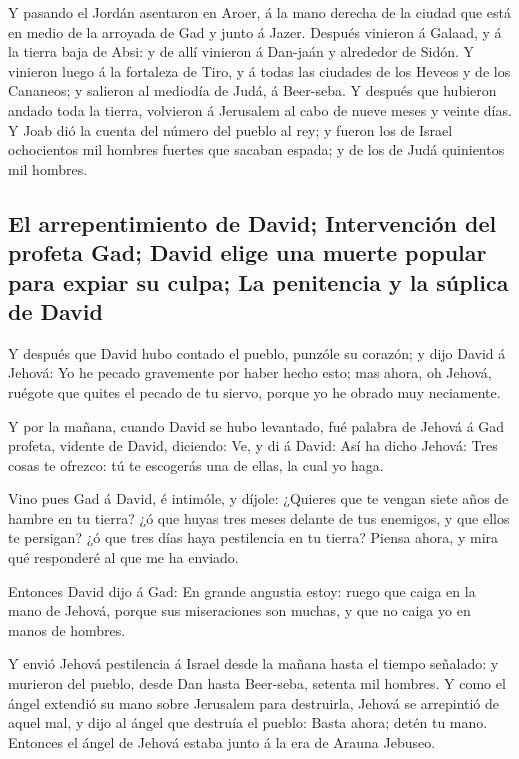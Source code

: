  Y pasando el Jordán asentaron en Aroer, á la mano derecha
de la ciudad que está en medio de la arroyada de Gad y junto á Jazer.
 Después vinieron á Galaad, y á la tierra baja de Absi: y de
allí vinieron á Dan-jaán y alrededor de Sidón.  Y vinieron
luego á la fortaleza de Tiro, y á todas las ciudades de los Heveos y de
los Cananeos; y salieron al mediodía de Judá, á Beer-seba. 
Y después que hubieron andado toda la tierra, volvieron á Jerusalem al
cabo de nueve meses y veinte días.  Y Joab dió la cuenta del
número del pueblo al rey; y fueron los de Israel ochocientos mil hombres
fuertes que sacaban espada; y de los de Judá quinientos mil hombres.

\hypertarget{el-arrepentimiento-de-david-intervenciuxf3n-del-profeta-gad-david-elige-una-muerte-popular-para-expiar-su-culpa-la-penitencia-y-la-suxfaplica-de-david}{%
\subsection{El arrepentimiento de David; Intervención del profeta Gad;
David elige una muerte popular para expiar su culpa; La penitencia y la
súplica de
David}\label{el-arrepentimiento-de-david-intervenciuxf3n-del-profeta-gad-david-elige-una-muerte-popular-para-expiar-su-culpa-la-penitencia-y-la-suxfaplica-de-david}}

 Y después que David hubo contado el pueblo, punzóle su
corazón; y dijo David á Jehová: Yo he pecado gravemente por haber hecho
esto; mas ahora, oh Jehová, ruégote que quites el pecado de tu siervo,
porque yo he obrado muy neciamente.

 Y por la mañana, cuando David se hubo levantado, fué
palabra de Jehová á Gad profeta, vidente de David, diciendo:
 Ve, y di á David: Así ha dicho Jehová: Tres cosas te
ofrezco: tú te escogerás una de ellas, la cual yo haga.

 Vino pues Gad á David, é intimóle, y díjole: ¿Quieres que
te vengan siete años de hambre en tu tierra? ¿ó que huyas tres meses
delante de tus enemigos, y que ellos te persigan? ¿ó que tres días haya
pestilencia en tu tierra? Piensa ahora, y mira qué responderé al que me
ha enviado.

 Entonces David dijo á Gad: En grande angustia estoy: ruego
que caiga en la mano de Jehová, porque sus miseraciones son muchas, y
que no caiga yo en manos de hombres.

 Y envió Jehová pestilencia á Israel desde la mañana hasta
el tiempo señalado: y murieron del pueblo, desde Dan hasta Beer-seba,
setenta mil hombres.  Y como el ángel extendió su mano
sobre Jerusalem para destruirla, Jehová se arrepintió de aquel mal, y
dijo al ángel que destruía el pueblo: Basta ahora; detén tu mano.
Entonces el ángel de Jehová estaba junto á la era de Arauna Jebuseo.

